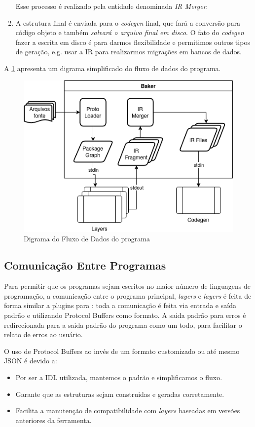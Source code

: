 \begin{enumerate}
  Esse processo é realizado pela entidade denominada \textit{IR Merger}.
\item A estrutura final é enviada para o \textit{codegen} final, que fará a conversão para código
  objeto e também \textit{salvará o arquivo final em disco}. O fato do \textit{codegen} fazer a
  escrita em disco é para darmos flexibilidade e permitimos outros tipos de geração, e.g. usar
  a IR para realizarmos migrações em bancos de dados.
\end{enumerate}

A \cref{fig:baker-data-flow} apresenta um digrama simplificado do fluxo de dados do programa.

\begin{figure}[h]
  \centering
  \includegraphics[width=0.8\linewidth]{Imagens/baker-diagram.png}
  \caption{Digrama do Fluxo de Dados do programa}
  \label{fig:baker-data-flow}
\end{figure}

\subsection{Comunicação Entre Programas}

Para permitir que os programas sejam escritos no maior número de linguagens de programação, a comunicação
entre o programa principal, \textit{layers} e \textit{layers} é feita de forma similar a plugins para
\cite{googl:protobuf}: toda a comunicação é feita via entrada e saída padrão e utilizando Protocol Buffers
como formato. A saida padrão para erros é redirecionada para a saida padrão do programa como um todo, para
facilitar o relato de erros ao usuário.

O uso de Protocol Buffers ao invés de um formato customizado ou até mesmo JSON é devido a:

\begin{itemize}
\item Por ser a IDL utilizada, mantemos o padrão e simplificamos o fluxo.
\item Garante que as estruturas sejam construidas e geradas corretamente.
\item Facilita a manutenção de compatibilidade com \textit{layers} baseadas em versões anteriores
  da ferramenta.
\end{itemize}
